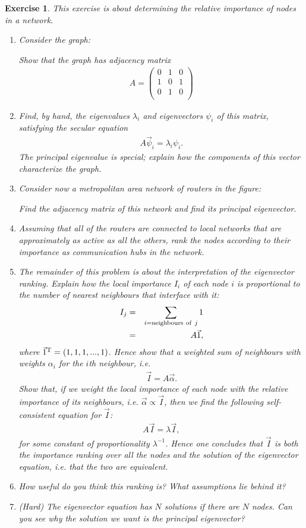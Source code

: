 \documentclass{book}
\newtheorem{exercise}{Exercise}
\def\beq{\begin{eqnarray}}
\def\eeq{\end{eqnarray}}
\begin{document}
\begin{exercise}
This exercise is about determining the relative importance of nodes in
a network.
\begin{enumerate}
\item Consider the graph:
\begin{figure}[ht]
\end{figure}
Show that the graph has adjacency matrix
\beq
A = \left(
\begin{array}{ccc}
0 & 1 & 0\\
1 & 0 & 1\\
0 & 1 & 0\\
\end{array}
\right)
\eeq

\item Find, by hand, the eigenvalues $\lambda_i$ and 
eigenvectors $\psi_i$ of this matrix, satisfying
the secular equation
\beq
A \vec \psi_i = \lambda_i \psi_i.
\eeq
The principal eigenvalue is special; 
explain how the components of this vector characterize the graph.

\item Consider now a metropolitan area network of routers in the figure:
\begin{figure}[ht]
\end{figure}
Find the adjacency matrix of this network and find its principal eigenvector.

\item Assuming that all of the routers are connected to local networks
that are approximately as active as all the others, rank the nodes
according to their importance as communication hubs in the network.

\item The remainder of this problem is about the interpretation of the
eigenvector ranking. Explain how the local importance $I_i$ of each node $i$
is proportional to the number of nearest neighbours that interface with it:
\beq
I_j &=& \sum_{i = {\rm neighbours~ of}~ j} 1\nonumber\\
    &=& A \vec 1,
\eeq
where $\vec 1^{\rm T} = (1,1,1,...,1)$. Hence show that a weighted sum
of neighbours with weights $\alpha_i$ for the $i$th neighbour, i.e.
\beq
\vec I = A \vec \alpha.
\eeq
Show that, if we weight the local importance of each node
with the relative importance of its neighbours,
i.e. $\vec \alpha \propto \vec I$, then we find the following self-consistent
equation for $\vec I$:
\beq
A \vec I = \lambda \vec I,
\eeq
for some constant of proportionality $\lambda^{-1}$. Hence one
concludes that $\vec I$ is both the importance ranking over all the nodes
and the solution of the eigenvector equation, i.e. that the two are equivalent.

\item How useful do you think this ranking is? What assumptions lie behind it?

\item (Hard) The eigenvector equation has $N$ solutions if there are $N$ nodes.
Can you see why the solution we want is the principal eigenvector?
\end{enumerate}
\end{exercise}
\end{document}
